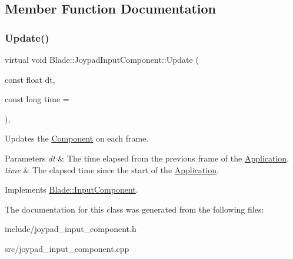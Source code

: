\subsection{Member Function Documentation}
\mbox{\label{class_blade_1_1_joypad_input_component_a386bea7c84d17eefa0d40bfa17575e04}} 
\subsubsection{\texorpdfstring{Update()}{Update()}}
{\footnotesize\ttfamily virtual void Blade\+::\+Joypad\+Input\+Component\+::\+Update (\begin{DoxyParamCaption}\item[{const float}]{dt,  }\item[{const long}]{time = {} }\end{DoxyParamCaption})\hspace{0.3cm}{\ttfamily [pure virtual]}, {\ttfamily [noexcept]}}



Updates the \hyperlink{class_blade_1_1_component}{Component} on each frame. 


\begin{DoxyParams}{Parameters}
{\em dt} & The time elapsed from the previous frame of the \hyperlink{class_blade_1_1_application}{Application}. \\
\hline
{\em time} & The elapsed time since the start of the \hyperlink{class_blade_1_1_application}{Application}. \\
\hline
\end{DoxyParams}


Implements \hyperlink{class_blade_1_1_input_component_aa7869b52200bb0a8c0c304fdf6147098}{Blade\+::\+Input\+Component}.



The documentation for this class was generated from the following files\+:\begin{DoxyCompactItemize}
\item 
include/joypad\+\_\+input\+\_\+component.\+h\item 
src/joypad\+\_\+input\+\_\+component.\+cpp\end{DoxyCompactItemize}
